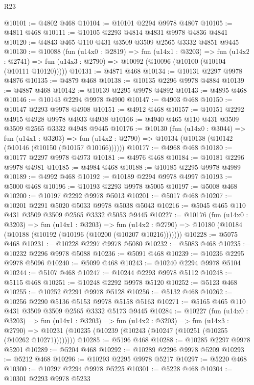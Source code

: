 \begin{lexlean}{R23}
\begin{coremodule}
@10101 := @4802 @468
@10104 := @10101 @2294 @9978 @4807
@10105 := @4811 @468
@10111 := @10105 @2293 @4814 @4831 @9978 @4836 @4841
@10120 := @4843 @465 @110 @431 @3509 @3509 @2565 @3332 @4851 @9445
@10130 := @10088
    (fun (u14x0 : @2819) =>
    fun (u14x1 : @3203) =>
    fun (u14x2 : @2741) => fun (u14x3 : @2790) => @10092 (@10096 (@10100 (@10104 (@10111 @10120)))))
@10131 := @4871 @468
@10134 := @10131 @2297 @9978 @4876
@10135 := @4879 @468
@10138 := @10135 @2296 @9978 @4884
@10139 := @4887 @468
@10142 := @10139 @2295 @9978 @4892
@10143 := @4895 @468
@10146 := @10143 @2294 @9978 @4900
@10147 := @4903 @468
@10150 := @10147 @2293 @9978 @4908
@10151 := @4912 @468
@10157 := @10151 @2292 @4915 @4928 @9978 @4933 @4938
@10166 := @4940 @465 @110 @431 @3509 @3509 @2565 @3332 @4948 @9445
@10176 := @10130
    (fun (u14x0 : @3044) =>
    fun (u14x1 : @3203) =>
    fun (u14x2 : @2790) => @10134 (@10138 (@10142 (@10146 (@10150 (@10157 @10166))))))
@10177 := @4968 @468
@10180 := @10177 @2297 @9978 @4973
@10181 := @4976 @468
@10184 := @10181 @2296 @9978 @4981
@10185 := @4984 @468
@10188 := @10185 @2295 @9978 @4989
@10189 := @4992 @468
@10192 := @10189 @2294 @9978 @4997
@10193 := @5000 @468
@10196 := @10193 @2293 @9978 @5005
@10197 := @5008 @468
@10200 := @10197 @2292 @9978 @5013
@10201 := @5017 @468
@10207 := @10201 @2291 @5020 @5033 @9978 @5038 @5043
@10216 := @5045 @465 @110 @431 @3509 @3509 @2565 @3332 @5053 @9445
@10227 := @10176
    (fun (u14x0 : @3203) =>
    fun (u14x1 : @3203) =>
    fun (u14x2 : @2790) => @10180 (@10184 (@10188 (@10192 (@10196 (@10200 (@10207 @10216)))))))
@10228 := @5075 @468
@10231 := @10228 @2297 @9978 @5080
@10232 := @5083 @468
@10235 := @10232 @2296 @9978 @5088
@10236 := @5091 @468
@10239 := @10236 @2295 @9978 @5096
@10240 := @5099 @468
@10243 := @10240 @2294 @9978 @5104
@10244 := @5107 @468
@10247 := @10244 @2293 @9978 @5112
@10248 := @5115 @468
@10251 := @10248 @2292 @9978 @5120
@10252 := @5123 @468
@10255 := @10252 @2291 @9978 @5128
@10256 := @5132 @468
@10262 := @10256 @2290 @5136 @5153 @9978 @5158 @5163
@10271 := @5165 @465 @110 @431 @3509 @3509 @2565 @3332 @5173 @9445
@10284 := @10227
    (fun (u14x0 : @3203) =>
    fun (u14x1 : @3203) =>
    fun (u14x2 : @3203) =>
    fun (u14x3 : @2790) =>
    @10231 (@10235 (@10239 (@10243 (@10247 (@10251 (@10255 (@10262 @10271))))))))
@10285 := @5196 @468
@10288 := @10285 @2297 @9978 @5201
@10289 := @5204 @468
@10292 := @10289 @2296 @9978 @5209
@10293 := @5212 @468
@10296 := @10293 @2295 @9978 @5217
@10297 := @5220 @468
@10300 := @10297 @2294 @9978 @5225
@10301 := @5228 @468
@10304 := @10301 @2293 @9978 @5233

\end{coremodule}
\end{lexlean}
